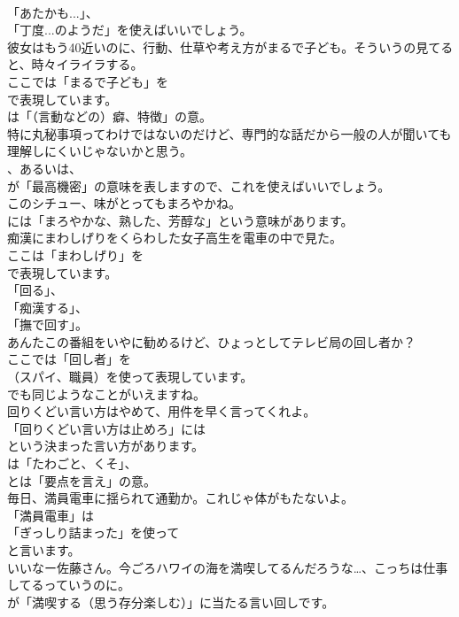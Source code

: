 \documentclass[8pt]{extreport}
\begin{document}
\begin{CJK}{UTF8}{min}
\\	「あたかも...」、
\\	「丁度...のようだ」を使えばいいでしょう。	
\\	彼女はもう40近いのに、行動、仕草や考え方がまるで子ども。そういうの見てると、時々イライラする。 
\\	ここでは「まるで子ども」を 
\\	で表現しています。
\\	は「（言動などの）癖、特徴」の意。	
\\	特に丸秘事項ってわけではないのだけど、専門的な話だから一般の人が聞いても理解しにくいじゃないかと思う。 
\\	、あるいは、
\\	が「最高機密」の意味を表しますので、これを使えばいいでしょう。	
\\	このシチュー、味がとってもまろやかね。 
\\	には「まろやかな、熟した、芳醇な」という意味があります。	
\\	痴漢にまわしげりをくらわした女子高生を電車の中で見た。 
\\	ここは「まわしげり」を
\\	で表現しています。
\\	「回る」、
\\	「痴漢する」、
\\	「撫で回す」。	
\\	あんたこの番組をいやに勧めるけど、ひょっとしてテレビ局の回し者か？ 
\\	ここでは「回し者」を
\\	（スパイ、職員）を使って表現しています。
\\	でも同じようなことがいえますね。	
\\	回りくどい言い方はやめて、用件を早く言ってくれよ。 
\\	「回りくどい言い方は止めろ」には
\\	という決まった言い方があります。
\\	は「たわごと、くそ」、
\\	とは「要点を言え」の意。	
\\	毎日、満員電車に揺られて通勤か。これじゃ体がもたないよ。 
\\	「満員電車」は
\\	「ぎっしり詰まった」を使って
\\	と言います。	
\\	いいなー佐藤さん。今ごろハワイの海を満喫してるんだろうな…、こっちは仕事してるっていうのに。 
\\	が「満喫する（思う存分楽しむ）」に当たる言い回しです。	

\end{CJK}
\end{document}
